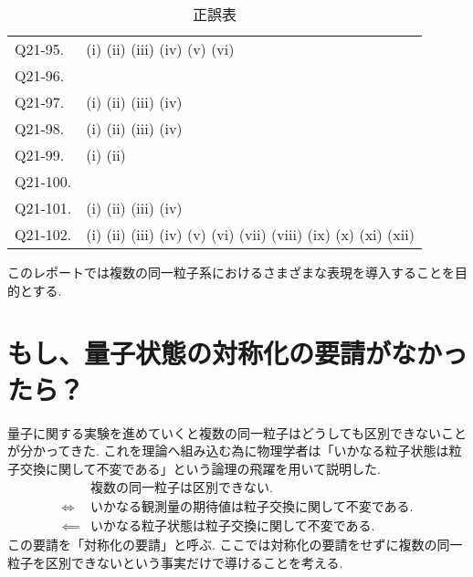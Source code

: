 \documentclass[uplatex,dvipdfmx,a4paper,11pt]{jlreq}
\numberwithin{equation}{section}
\theoremstyle{definition}
\begin{document}
\begin{table}[hbtp]
\begin{tabular}{ll}
    Q21-95.  & (i) \quad (ii) \quad (iii) \quad (iv) \quad (v) \quad (vi) \quad                                                                                               \\
    Q21-96.  & \quad                                                                                                                                                          \\
    Q21-97.  & (i) \quad (ii) \quad (iii) \quad (iv) \quad                                                                                                                    \\
    Q21-98.  & (i) \quad (ii) \quad (iii) \quad (iv) \quad                                                                                                                    \\
    Q21-99.  & (i) \quad (ii) \quad                                                                                                                                           \\
    Q21-100. & \quad                                                                                                                                                          \\
    Q21-101. & (i) \quad (ii) \quad (iii) \quad (iv) \quad                                                                                                                    \\
    Q21-102. & (i) \quad (ii) \quad (iii) \quad (iv) \quad (v) \quad (vi) \quad (vii) \quad (viii) \quad (ix) \quad (x) \quad (xi) \quad (xii) \quad                          \\
    \hline
  \end{tabular}
  \caption{正誤表}
\end{table}
\clearpage

このレポートでは複数の同一粒子系におけるさまざまな表現を導入することを目的とする.

\section{もし、量子状態の対称化の要請がなかったら？}
量子に関する実験を進めていくと複数の同一粒子はどうしても区別できないことが分かってきた. これを理論へ組み込む為に物理学者は「いかなる粒子状態は粒子交換に関して不変である」という論理の飛躍を用いて説明した.
\begin{align}
             & \textrm{複数の同一粒子は区別できない.}            \\
  \iff       & \textrm{いかなる観測量の期待値は粒子交換に関して不変である.} \\
  \impliedby & \textrm{いかなる粒子状態は粒子交換に関して不変である.}
\end{align}
この要請を「対称化の要請」と呼ぶ. ここでは対称化の要請をせずに複数の同一粒子を区別できないという事実だけで導けることを考える.
\end{document}
